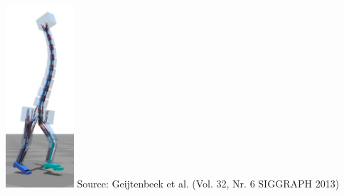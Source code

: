 \documentclass{beamer}
\begin{document}
\begin{frame}
\href{run:figs/videos/super-neck-dude.mp4}{\includegraphics[width=0.19\textwidth]{figs/limiters/5.png}} 
\tiny{Source: Geijtenbeek et al. (Vol. 32, Nr. 6 SIGGRAPH 2013)}
\end{frame}
\end{document}
